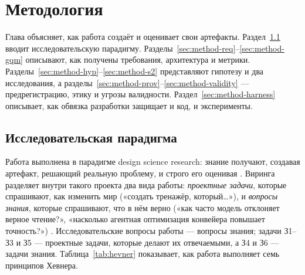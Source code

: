 \chapter{Методология}\label{ch:method}

Глава объясняет, как работа создаёт и оценивает свои артефакты. Раздел~\ref{sec:method-dsr} вводит
исследовательскую парадигму. Разделы~\ref{sec:method-req}--\ref{sec:method-gqm} описывают, как получены
требования, архитектура и метрики. Разделы~\ref{sec:method-hyp}--\ref{sec:method-s2} представляют гипотезу и два исследования, а разделы~\ref{sec:method-prov}--\ref{sec:method-validity} --- предрегистрацию, этику и
угрозы валидности. Раздел~\ref{sec:method-harness} описывает, как обвязка разработки защищает и код, и
эксперименты.

\section{Исследовательская парадигма}\label{sec:method-dsr}

Работа выполнена в парадигме design science research: знание получают, создавая артефакт, решающий
реальную проблему, и строго его оценивая \cite{SRC-100}. Виринга разделяет внутри такого проекта два вида
работы: \emph{проектные задачи}, которые спрашивают, как изменить мир («создать тренажёр, который…»), и
\emph{вопросы знания}, которые спрашивают, что в нём верно («как часто модель отклоняет верное
чтение?», «насколько агентная оптимизация конвейера повышает точность?») \cite{SRC-101}. Исследовательские вопросы
работы --- вопросы знания; задачи З1--З3 и З5 --- проектные задачи, которые делают их отвечаемыми, а З4 и З6 --- задачи знания. Таблица~\ref{tab:hevner} показывает, как работа
выполняет семь принципов Хевнера.

